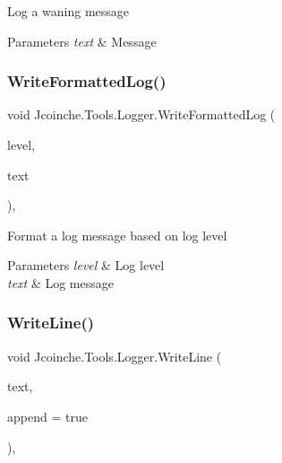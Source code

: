Log a waning message 


\begin{DoxyParams}{Parameters}
{\em text} & Message\\
\hline
\end{DoxyParams}
\mbox{\label{class_jcoinche_1_1_tools_1_1_logger_a2dc08a5d649ad85fac9cb420c97e9c58}} 
\subsubsection{\texorpdfstring{Write\+Formatted\+Log()}{WriteFormattedLog()}}
{\footnotesize\ttfamily void Jcoinche.\+Tools.\+Logger.\+Write\+Formatted\+Log (\begin{DoxyParamCaption}\item[{\hyperlink{class_jcoinche_1_1_tools_1_1_logger_ab4fd521c5dbf009c3be7606a842a6e5b}{Log\+Level}}]{level,  }\item[{string}]{text }\end{DoxyParamCaption})\hspace{0.3cm}{\ttfamily [inline]}, {\ttfamily [private]}}



Format a log message based on log level 


\begin{DoxyParams}{Parameters}
{\em level} & Log level\\
\hline
{\em text} & Log message\\
\hline
\end{DoxyParams}
\mbox{\label{class_jcoinche_1_1_tools_1_1_logger_ac17f4d332af0cc9fadd78f1b4c97a349}} 
\subsubsection{\texorpdfstring{Write\+Line()}{WriteLine()}}
{\footnotesize\ttfamily void Jcoinche.\+Tools.\+Logger.\+Write\+Line (\begin{DoxyParamCaption}\item[{string}]{text,  }\item[{bool}]{append = {\ttfamily true} }\end{DoxyParamCaption})\hspace{0.3cm}{\ttfamily [inline]}, {\ttfamily [private]}}



